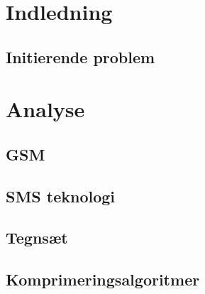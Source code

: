 \documentclass[12pt,a4paper]{report}
\begin{document}
\setcounter{page}{2}

\begin{titlepage}

\thispagestyle{empty}
\end{titlepage}



\tableofcontents
\thispagestyle{empty}

\renewcommand{\chaptername}{Kapitel}

\chapter{Indledning}
\setcounter{page}{3}
	
	\section{Initierende problem}
	

\chapter{Analyse}
 
    

    \section{GSM}
    

	\section{SMS teknologi}
	
	
	\section{Tegnsæt}
	
	
	\section{Komprimeringsalgoritmer}
	
	
\end{document}
